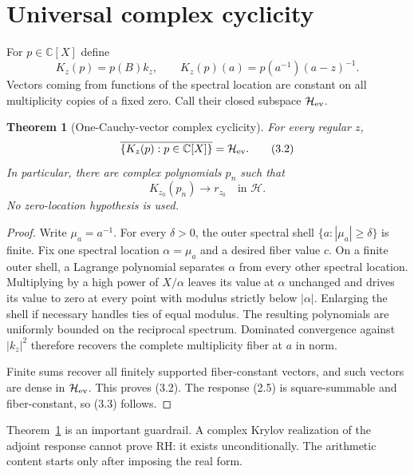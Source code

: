 \documentclass[11pt]{article}
\newtheorem{theorem}{Theorem}[section]
\theoremstyle{definition}
\theoremstyle{remark}
\newcommand{\C}{\mathbb C}
\newcommand{\cH}{\mathcal H}
\begin{document}
\section{Universal complex cyclicity}

For $p\in\C[X]$ define
\begin{equation}
 K_z(p)=p(B)k_z,
 \qquad
 K_z(p)(a)=p(a^{-1})(a-z)^{-1}.                           \tag{3.1}
\end{equation}
Vectors coming from functions of the spectral location are constant on all multiplicity copies
of a fixed zero.  Call their closed subspace $\cH_{\rm ev}$.

\begin{theorem}[One-Cauchy-vector complex cyclicity]
\label{thm:cyclic}
For every regular $z$,
\begin{equation}
 \overline{\{K_z(p):p\in\C[X]\}}=\cH_{\rm ev}.           \tag{3.2}
\end{equation}
In particular, there are complex polynomials $p_n$ such that
\begin{equation}
 K_{z_0}(p_n)\longrightarrow r_{z_0}\quad\text{in }\cH. \tag{3.3}
\end{equation}
No zero-location hypothesis is used.
\end{theorem}

\begin{proof}
Write $\mu_a=a^{-1}$.  For every $\delta>0$, the outer spectral shell
$\{a:|\mu_a|\geq\delta\}$ is finite.  Fix one spectral location $\alpha=\mu_a$ and a desired
fiber value $c$.  On a finite outer shell, a Lagrange polynomial separates $\alpha$ from every
other spectral location.  Multiplying by a high power of $X/\alpha$ leaves its value at
$\alpha$ unchanged and drives its value to zero at every point with modulus strictly below
$|\alpha|$.  Enlarging the shell if necessary handles ties of equal modulus.  The resulting
polynomials are uniformly bounded on the reciprocal spectrum.  Dominated convergence against
$|k_z|^2$ therefore recovers the complete multiplicity fiber at $a$ in norm.

Finite sums recover all finitely supported fiber-constant vectors, and such vectors are dense in
$\cH_{\rm ev}$.  This proves (3.2).  The response (2.5) is square-summable and fiber-constant,
so (3.3) follows.
\end{proof}

Theorem~\ref{thm:cyclic} is an important guardrail.  A complex Krylov realization of the adjoint
response cannot prove RH: it exists unconditionally.  The arithmetic content starts only after
imposing the real form.
\end{document}
